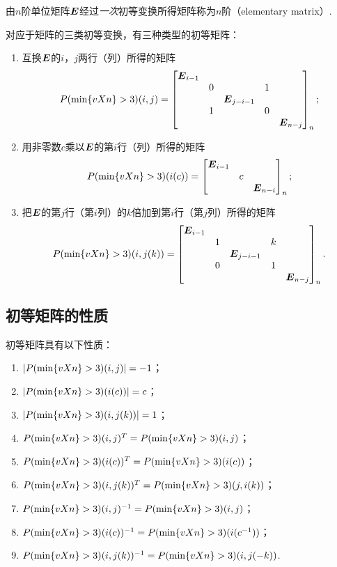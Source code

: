 \begin{definition}
由\(n\)阶单位矩阵\(\E\)经过\emph{一次}初等变换所得矩阵称为\(n\)阶（elementary matrix）.
\end{definition}
对应于矩阵的三类初等变换，有三种类型的初等矩阵：
\begin{enumerate}
\item 互换\(\E\)的\(i\)，\(j\)两行（列）所得的矩阵\[
\P(i,j) = \begin{bmatrix}
\E_{i-1} & & & \\
& 0 & & 1 & \\
& & \E_{j-i-1} & & \\
& 1 & & 0 & \\
& & & & \E_{n-j}
\end{bmatrix}_n;
\]
\item 用非零数\(c\)乘以\(\E\)的第\(i\)行（列）所得的矩阵\[
\P(i(c)) = \begin{bmatrix}
\E_{i-1} & & \\
& c & \\
& & \E_{n-i}
\end{bmatrix}_n;
\]
\item 把\(\E\)的第\(j\)行（第\(i\)列）的\(k\)倍加到第\(i\)行（第\(j\)列）所得的矩阵\[
\P(i,j(k)) = \begin{bmatrix}
\E_{i-1} & & & \\
& 1 & & k & \\
& & \E_{j-i-1} & & \\
& 0 & & 1 & \\
& & & & \E_{n-j}
\end{bmatrix}_n.
\]
\end{enumerate}

\subsection{初等矩阵的性质}
\begin{property}\label{theorem:逆矩阵.初等矩阵的性质1}
初等矩阵具有以下性质：
\begin{enumerate}
\item \(\abs{\P(i,j)}=-1\)；
\item \(\abs{\P(i(c))}=c\)；
\item \(\abs{\P(i,j(k))}=1\)；
\item \(\P(i,j)^T=\P(i,j)\)；
\item \(\P(i(c))^T=\P(i(c))\)；
\item \(\P(i,j(k))^T=\P(j,i(k))\)；
\item \(\P(i,j)^{-1}=\P(i,j)\)；
\item \(\P(i(c))^{-1}=\P(i(c^{-1}))\)；
\item \(\P(i,j(k))^{-1}=\P(i,j(-k))\).
\end{enumerate}
\end{property}

